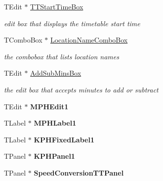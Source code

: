 \begin{DoxyCompactItemize}
T\+Edit $\ast$ \mbox{\hyperlink{class_t_interface_aa3e7a74c49f2afc9c61821f5606b13cd}{T\+T\+Start\+Time\+Box}}
\begin{DoxyCompactList}\small\item\em edit box that displays the timetable start time \end{DoxyCompactList}\item 
\mbox{\label{class_t_interface_a68191596344fa3f2f7c8b4feadb8ab4f}} 
T\+Combo\+Box $\ast$ \mbox{\hyperlink{class_t_interface_a68191596344fa3f2f7c8b4feadb8ab4f}{Location\+Name\+Combo\+Box}}
\begin{DoxyCompactList}\small\item\em the combobox that lists location names \end{DoxyCompactList}\item 
\mbox{\label{class_t_interface_abc16ad27bf676c2533855c4a092f43e4}} 
T\+Edit $\ast$ \mbox{\hyperlink{class_t_interface_abc16ad27bf676c2533855c4a092f43e4}{Add\+Sub\+Mins\+Box}}
\begin{DoxyCompactList}\small\item\em the edit box that accepts minutes to add or subtract \end{DoxyCompactList}\item 
\mbox{\label{class_t_interface_a179a3a2b975332094e82fcb9d1de3111}} 
T\+Edit $\ast$ {\bfseries M\+P\+H\+Edit1}
\item 
\mbox{\label{class_t_interface_a774a7ea46743a8ba8f6cd78eee0d6ba8}} 
T\+Label $\ast$ {\bfseries M\+P\+H\+Label1}
\item 
\mbox{\label{class_t_interface_adea3fe8d9345ab6eeff38a755ac1d4bf}} 
T\+Label $\ast$ {\bfseries K\+P\+H\+Fixed\+Label1}
\item 
\mbox{\label{class_t_interface_a3d19fe789473ab0504e3cecf514175e8}} 
T\+Panel $\ast$ {\bfseries K\+P\+H\+Panel1}
\item 
\mbox{\label{class_t_interface_a3216d2f4e638c29d6e531dd8b83aa675}} 
T\+Panel $\ast$ {\bfseries Speed\+Conversion\+T\+T\+Panel}
\item 
\mbox{\label{class_t_interface_aaadaad646dd0ee112b5507d1240ca7ea}} 

\end{DoxyCompactItemize}
